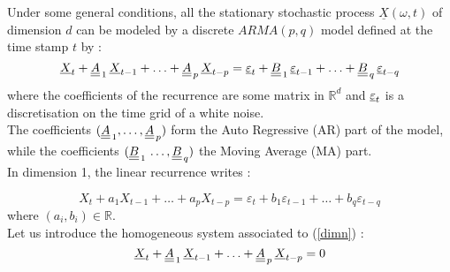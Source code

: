 \renewcommand{\filename}{docUC_StocProc_NormalIntro.tex}
\renewcommand{\filetitle}{Intro}







Under some general conditions, all the stationary stochastic process $\underline{X}(\omega,t)$ of dimension $d$ can be modeled by a discrete $ARMA(p,q)$ model defined at the time stamp $t$ by :
\begin{equation}\label{dimn}
 {\underline{X}}_t + {\underline{\underline{A}}}_{\, 1}   \,  {\underline{X}}_{t-1} + \hdots +  {\underline{\underline{A}}}_{\, p} \,   {\underline{X}}_{t-p} = 
   {\underline{\varepsilon}}_{t}+  {\underline{\underline{B}}}_ {\, 1} \,   {\underline{\varepsilon}}_{t-1}+   \hdots + {\underline{\underline{B}}}_{\, q}  \,  {\underline{\varepsilon}}_{t-q}
\end{equation}
where the coefficients of the recurrence are some matrix in $\mathbb{R}^d$ and $ {\underline{\varepsilon}}_t$ is a  discretisation on the time grid of a white noise.\\
The coefficients $({\underline{\underline{A}}}_{\, 1} , \hdots, {\underline{\underline{A}}}_{\, p} )$ form the Auto Regressive (AR) part of the model, while the coefficients $({\underline{\underline{B}}}_{\, 1} \, \hdots, {\underline{\underline{B}}}_{\, q}  )$ the Moving Average (MA) part. \\

In dimension 1, the linear recurrence writes : 

\begin{equation}\label{dim1}
X_t +a_1  X_{t-1} + \hdots +  a_p X_{t-p} = 
  \varepsilon_{t}+  b_1 \varepsilon_{t-1}+   \hdots +b_q \varepsilon_{t-q}
\end{equation}
where $(a_i,b_i) \in \mathbb{R}$.\\


Let us introduce the homogeneous system associated to (\ref{dimn}) :
\begin{equation}\label{dimnHom}
 {\underline{X}}_t + {\underline{\underline{A}}}_{\, 1}   \,  {\underline{X}}_{t-1} + \hdots +  {\underline{\underline{A}}}_{\, p} \,   {\underline{X}}_{t-p} = 0
\end{equation}


